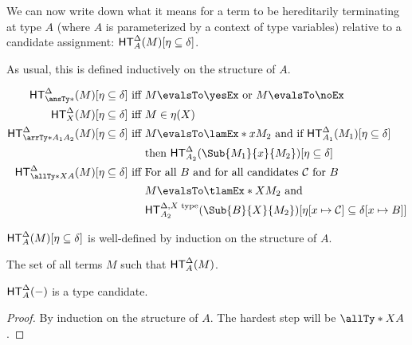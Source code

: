 \documentclass[letterpaper]{article}
\begin{document}
We can now write down what it means for a term to be hereditarily terminating at type $A$ (where $A$ is parameterized by a context of type variables) relative to a candidate assignment: $\HT^{\Delta}(M)[\eta \subseteq \delta]$.

As usual, this is defined inductively on the structure of $A$.

\begin{align*}
\HT[\ansTy*]^{\Delta}(M)[\eta \subseteq \delta]  \text{ iff }&  M \evalsTo \yesEx \text{ or } M \evalsTo \noEx \\
\HT[X]^{\Delta}(M)[\eta \subseteq \delta]  \text{ iff }&  M \in \eta(X) \\
\HT[\arrTy*{A_1}{A_2}]^{\Delta}(M)[\eta \subseteq \delta]  \text{ iff }&  M \evalsTo \lamEx*{x}{M_2} \text{ and if } \HT[A_1]^{\Delta}(M_1)[\eta \subseteq \delta]\\   & \text{then } \HT[A_2]^{\Delta}(\Sub{M_1}{x}{M_2})[\eta \subseteq \delta] \\
\HT[\allTy*{X}{A}]^{\Delta}(M)[\eta \subseteq \delta]  \text{ iff }&  \text{For all } B \text{ and for all candidates } \mathcal{C} \text{ for } B \\ & M \evalsTo \tlamEx*{X}{M_2} \text{ and } \\ & \HT[A_2]^{\Delta, X \text{ type}}(\Sub{B}{X}{M_2})[\eta[x \mapsto \mathcal{C}] \subseteq \delta[x \mapsto B]]
\end{align*}

\begin{lemma}\label{lem:welldefined}
$\HT^{\Delta}(M)[\eta \subseteq \delta]$ is well-defined by induction on the structure of $A$.
\end{lemma}

\begin{definition}[$\HT^{\Delta}(-)$]
The set of all terms $M$ such that $\HT^{\Delta}(M)$.
\end{definition}

\begin{lemma}\label{lem:ht-candidate}
$\HT^{\Delta}(-)$ is a type candidate.
\end{lemma}
\begin{proof}
By induction on the structure of $A$. The hardest step will be $\allTy*{X}{A}$.
\end{proof}
\end{document}
